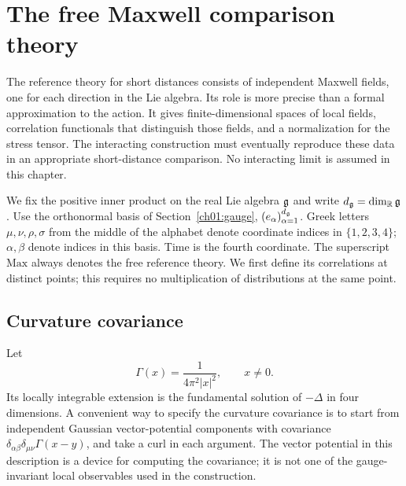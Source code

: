 \chapter{The free Maxwell comparison theory}\label{ch03:maxwell}

The reference theory for short distances consists of independent Maxwell
fields, one for each direction in the Lie algebra. Its role is more precise
than a formal approximation to the action. It gives finite-dimensional
spaces of local fields, correlation functionals that distinguish those
fields, and a normalization for the stress tensor. The interacting
construction must eventually reproduce these data in an appropriate
short-distance comparison. No interacting limit is assumed in this chapter.

We fix the positive inner product on the real Lie algebra $\mathfrak g$ and write
$d_{\mathfrak g}=\dim_{\mathbb R}\mathfrak g$. Use the orthonormal basis of Section~\ref{ch01:gauge},
$(e_\alpha)_{\alpha=1}^{d_{\mathfrak g}}$. Greek letters $\mu,\nu,\rho,\sigma$
from the middle of the alphabet denote coordinate indices in
$\{1,2,3,4\}$; $\alpha,\beta$ denote indices in this basis. Time is the fourth
coordinate. The superscript $\mathrm{Max}$ always denotes the free
reference theory. We first define its correlations at distinct points;
this requires no multiplication of distributions at the same point.

\section{Curvature covariance}\label{ch03:covariance}

Let
\begin{equation}\label{ch03:green}
 \Gamma(x)=\frac{1}{4\pi^2|x|^2},\qquad x\ne0.
\end{equation}
Its locally integrable extension is the fundamental solution of
$-\Delta$ in four dimensions. A convenient way to specify the curvature
covariance is to start from independent Gaussian vector-potential
components with covariance
$\delta_{\alpha\beta}\delta_{\mu\nu}\Gamma(x-y)$, and take a curl in
each argument. The vector potential in this description is a device for
computing the covariance; it is not one of the gauge-invariant local
observables used in the construction.

